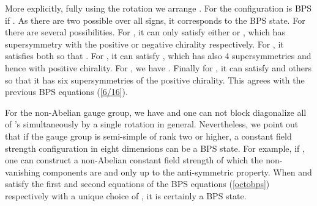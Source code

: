 \documentclass[a4paper,11pt]{article}
\begin{document}
More explicitly, fully using the \coordHE{} rotation  we arrange \coordHE{}.  For \coordHE{} the configuration is
BPS if \coordHE{}. As there are two possible over all signs, it corresponds to the \coordHE{} BPS state. For \coordHE{}  there are several
possibilities. For \coordHE{}, it can only satisfy either \coordHE{} or \coordHE{}, which has
\coordHE{} supersymmetry with the positive or negative chirality respectively. For \coordHE{}, it satisfies both so that \coordHE{}.
For \coordHE{}, it can satisfy \coordHE{}, which has also 4 supersymmetries and hence \coordHE{} with positive chirality.
For \coordHE{}, we have \coordHE{}.  Finally for \coordHE{}, it can satisfy \coordHE{} and others so that it has six
supersymmetries of the positive chirality. This agrees with the previous \coordHE{} BPS equations (\ref{6/16}).



For the non-Abelian gauge group, we have \coordHE{} and one can not block diagonalize  all of \coordHE{}'s
simultaneously by a single \coordHE{} rotation in general. Nevertheless, we point out  that if the gauge group is  semi-simple of rank two or
higher,  a constant field  strength configuration in eight dimensions  can be a \coordHE{} BPS state. For example, if \coordHE{},  one can
construct a non-Abelian constant field strength of which the non-vanishing components are  \coordHE{} and
\coordHE{} only up to the anti-symmetric property. When \coordHE{} and \coordHE{} satisfy the first and
second  equations of the \coordHE{}  BPS equations (\ref{octobps}) respectively  with a unique choice of \myHighlight{$\alpha$}\coordHE{}, it is certainly a \coordHE{} BPS state.
\end{document}
